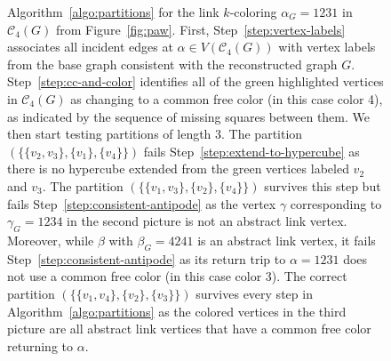 \documentclass{amsart}
\theoremstyle{hypothesisstyle}
\theoremstyle{definition}
\theoremstyle{remark}
\numberwithin{equation}{section}
\newcommand{\C}{\mathcal C}
\begin{document}
\begin{figure}[ht]
\begin{center}
\hspace{3pc}
\end{center}
    \caption{Algorithm~\ref{algo:partitions} for the link $k$-coloring $\alpha_G = 1231$ in $\C_4(G)$ from Figure~\ref{fig:paw}. First,  Step~\ref{step:vertex-labels} associates all incident edges at $\alpha\in V(\C_4(G))$ with vertex labels from the base graph consistent with the reconstructed graph $G$. Step~\ref{step:cc-and-color} identifies all of the green highlighted vertices in $\C_4(G)$ as changing to a common free color (in this case color 4), as indicated by the sequence of missing squares between them.  We then start testing partitions of length 3.  The partition $\left(\{\{v_2,v_3\},\{v_1\},\{v_4\}\}\right)$ fails Step~\ref{step:extend-to-hypercube} as there is no hypercube extended from the green vertices labeled $v_2$ and $v_3$. The partition $\left(\{\{v_1,v_3\},\{v_2\},\{v_4\}\}\right)$ survives this step but fails Step~\ref{step:consistent-antipode} as the vertex $\gamma$ corresponding to $\gamma_G = 1234$ in the second picture is not an abstract link vertex. Moreover, while $\beta$ with $\beta_G=4241$ is an abstract link vertex, it fails Step~\ref{step:consistent-antipode} as its return trip to $\alpha = 1231$ does not use a common free color (in this case color 3).  The correct partition $\left(\{\{v_1,v_4\},\{v_2\},\{v_3\}\}\right)$ survives every step in Algorithm~\ref{algo:partitions} as the colored vertices in the third picture are all abstract link vertices that have a common free color returning to $\alpha$.
       }\label{fig:paw-partition}
\end{figure}
\end{document}
